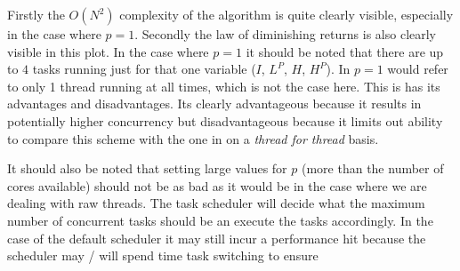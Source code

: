 Firstly the $ O(N^2) $ complexity of the algorithm is quite clearly visible, especially in the case where $ p = 1 $. Secondly the law of diminishing returns is also clearly visible in this plot. In the case where $ p = 1 $ it should be noted that there are up to $ 4 $ tasks running just for that one variable ($ I $, $ L^P $, $ H $, $ H^P $). In \cite{Diethelm2011} $ p = 1 $ would refer to only 1 thread running at all times, which is not the case here. This is has its advantages and disadvantages.  Its clearly advantageous because it results in potentially higher concurrency but disadvantageous because it limits out ability to compare this scheme with the one in \cite{Diethelm2011} on a \emph{thread for thread} basis. 

It should also be noted that setting large values for $ p $ (more than the number of cores available) should not be as bad as it would be in the case where we are dealing with raw threads. The task scheduler will decide what the maximum number of concurrent tasks should be an execute the tasks accordingly. In the case of the default scheduler it may still incur a performance hit because the scheduler may / will spend time task switching to ensure 
